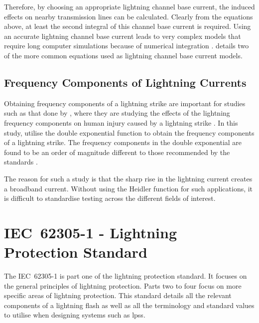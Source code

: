 Therefore, by choosing an appropriate lightning channel base current, the induced effects on nearby transmission lines can be calculated. Clearly from the equations above, at least the second integral of this channel base current is required. Using an accurate lightning channel base current leads to very complex models that require long computer simulations because of numerical integration \cite{Paolone2009}.  details two of the more common equations used as lightning channel base current models.

\subsection{Frequency Components of Lightning Currents}
\label{sub:background_frequency_components_of_lightning_currents}
Obtaining frequency components of a lightning strike are important for studies such as that done by \citeauthor{Lee2014}, where they are studying the effects of the lightning frequency components on human injury caused by a lightning strike \cite{Lee2014}. In this study, \citeauthor{Lee2014} utilise the double exponential function to obtain the frequency components of a lightning strike. The frequency components in the double exponential are found to be an order of magnitude different to those recommended by the standards \cite{1422588}.

The reason for such a study is that the sharp rise in the lightning current creates a broadband current. Without using the Heidler function for such applications, it is difficult to standardise testing across the different fields of interest.


\section{IEC~62305-1 - Lightning Protection Standard}
\label{sec:background_iec62305}
The IEC~62305-1 is part one of the lightning protection standard. It focuses on the general principles of lightning protection. Parts two to four focus on more specific areas of lightning protection. This standard details all the relevant components of a lightning flash as well as all the terminology and standard values to utilise when designing systems such as \glspl{lps}.

